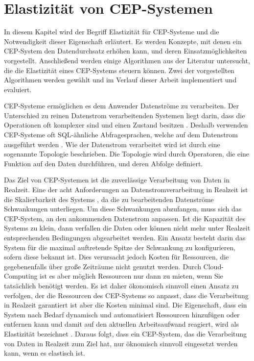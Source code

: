 \chapter{Elastizität von CEP-Systemen}

In diesem Kapitel wird der Begriff Elastizität für CEP-Systeme und die Notwendigkeit dieser Eigenschaft erläutert.
Es werden Konzepte, mit denen ein CEP-System den Datendurchsatz erhöhen kann, und deren Einsatzmöglichkeiten vorgestellt.
Anschließend werden einige Algorithmen aus der Literatur untersucht, die die Elastizität eines CEP-Systems steuern können.
Zwei der vorgestellten Algorithmen werden gewählt und im Verlauf dieser Arbeit implementiert und evaluiert.

CEP-Systeme ermöglichen es dem Anwender Datenströme zu verarbeiten.
Der Unterschied zu reinen Datenstrom verarbeitenden Systemen liegt darin, dass die Operationen oft komplexer sind und einen Zustand besitzen  \cite{carbone_towards_2013}.
Deshalb verwenden CEP-Systeme oft SQL-ähnliche Abfragesprachen, welche auf dem Datenstrom ausgeführt werden \cite{carbone_towards_2013}.
Wie der Datenstrom verarbeitet wird ist durch eine sogenannte Topologie beschrieben.
Die Topologie wird durch Operatoren, die eine Funktion auf den Daten durchführen, und deren Abfolge definiert.

Das Ziel von CEP-Systemen ist die zuverlässige Verarbeitung von Daten in Realzeit.
Eine der acht Anforderungen an Datenstromverarbeitung in Realzeit ist die Skalierbarkeit des Systems \cite{stonebraker_8_2005}, da die zu bearbeitenden Datenströme Schwankungen unterliegen.
Um diese Schwankungen abzufangen, muss sich das CEP-System, an den ankommenden Datenstrom anpassen.
Ist die Kapazität des Systems zu klein, dann verfallen die Daten oder können nicht mehr unter Realzeit entsprechenden Bedingungen abgearbeitet werden.
Ein Ansatz besteht darin das System für die maximal auftretende Spitze der Schwankung zu konfigurieren, sofern diese bekannt ist.
Dies verursacht jedoch Kosten für Ressourcen, die gegebenenfalls über große Zeiträume nicht genutzt werden.
Durch Cloud-Computing ist es aber möglich Ressourcen nur dann zu mieten, wenn Sie tatsächlich benötigt werden.
Es ist daher ökonomisch sinnvoll einen Ansatz zu verfolgen, der die Ressourcen des CEP-Systems so anpasst, dass die Verarbeitung in Realzeit garantiert ist aber die Kosten minimal sind.
Die Eigenschaft, dass ein System nach Bedarf dynamisch und automatisiert Ressourcen hinzufügen oder entfernen kann und damit auf den aktuellen Arbeitsaufwand reagiert, wird als Elastizität bezeichnet \cite{herbst_elasticity_nodate}.
Daraus folgt, dass ein CEP-System, das die Verarbeitung von Daten in Realzeit zum Ziel hat, nur öknomisch sinnvoll eingesetzt werden kann, wenn es elastisch ist.

